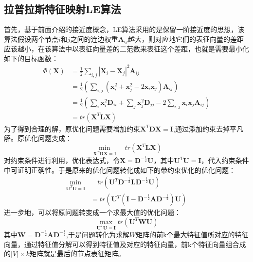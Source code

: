 \subsection{拉普拉斯特征映射LE算法}
首先，基于前面介绍的接近度概念，LE算法采用的是保留一阶接近度的思想，该算法假设两个节点$i$和$j$之间的连边权重$\textbf{A}_{ij}$越大，则对应地它们的表征向量的差距应该越小，在该算法中以表征向量差的二范数来表征这个差距，也就是需要最小化如下的目标函数：
\begin{equation}
\begin{aligned}
\Phi(\textbf{X}) &= \frac{1}{2}\sum_{i,j}|\textbf{X}_i - \textbf{X}_j|^2\textbf{A}_{ij} \\
&= \frac{1}{2}(\sum_{i,j}(\textbf{x}_i^2+\textbf{x}_j^2-2\textbf{x}_i\textbf{x}_j) \textbf{A}_{ij}) \\
&=\frac{1}{2} (\sum_i\textbf{x}_i^2\textbf{D}_{ii} +\sum_j \textbf{x}_j^2 \textbf{D}_{jj} - 2\sum_{i,j}\textbf{x}_i \textbf{x}_j \textbf{A}_{ij}) \\
&= tr(\textbf{X}^T\textbf{L}\textbf{X})
\end{aligned}
\end{equation}
为了得到合理的解，原优化问题需要增加约束$\textbf{X}^T\textbf{D}\textbf{X}=\textbf{I}$,通过添加约束去掉平凡解。原优化问题变成：
\begin{equation}
\min_{\textbf{X}^T\textbf{D}\textbf{X}=\textbf{I}} \quad tr(\textbf{X}^T\textbf{L}\textbf{X})
\end{equation}
对约束条件进行利用，优化表达式，令$\textbf{X}=\textbf{D}^{-\frac{1}{2}}\textbf{U}$，其中$\textbf{U}^T\textbf{U} = \textbf{I}$，代入约束条件中可证明正确性。于是原来的优化问题转化成如下的带约束优化的优化问题：
\begin{equation}\label{laplacian_reduce}
\begin{aligned}
\min_{\textbf{U}^T\textbf{U} = \textbf{I}} &\quad tr(\textbf{U}^T\textbf{D}^{-\frac{1}{2}}\textbf{L}\textbf{D}^{-\frac{1}{2}}\textbf{U}) \\
&= tr(\textbf{U}^T(\textbf{I}-\textbf{D}^{-\frac{1}{2}}\textbf{A}\textbf{D}^{-\frac{1}{2}})\textbf{U})
\end{aligned}
\end{equation}
进一步地，可以将原问题转变成一个求最大值的优化问题：
\begin{equation}
\max_{\textbf{U}^T\textbf{U} = \textbf{I}} tr(\textbf{U}^T\textbf{W}\textbf{U})
\end{equation}
其中$\textbf{W} = \textbf{D}^{-\frac{1}{2}}\textbf{A}\textbf{D}^{-\frac{1}{2}} $,于是问题转化为求解$W$矩阵的前k个最大特征值所对应的特征向量，通过特征值分解可以得到特征值及对应的特征向量，前k个特征向量组合成的$|V|\times k$矩阵就是最后的节点表征矩阵。

